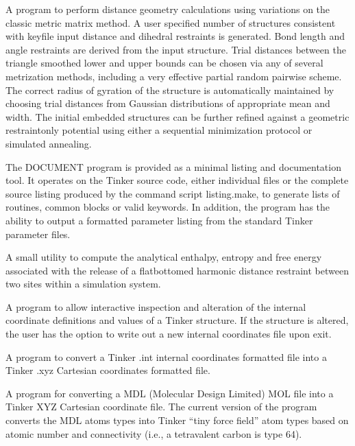 \documentclass[letterpaper,11pt,english]{sphinxmanual}
\begin{document}

A program to perform distance geometry calculations using variations on the classic metric matrix method. A user specified number of structures consistent with keyfile input distance and dihedral restraints is generated. Bond length and angle restraints are derived from the input structure. Trial distances between the triangle smoothed lower and upper bounds can be chosen via any of several metrization methods, including a very effective partial random pairwise scheme. The correct radius of gyration of the structure is automatically maintained by choosing trial distances from Gaussian distributions of appropriate mean and width. The initial embedded structures can be further refined against a geometric restraint\sphinxhyphen{}only potential using either a sequential minimization protocol or simulated annealing.


The DOCUMENT program is provided as a minimal listing and documentation tool. It operates on the Tinker source code, either individual files or the complete source listing produced by the command script listing.make, to generate lists of routines, common blocks or valid keywords. In addition, the program has the ability to output a formatted parameter listing from the standard Tinker parameter files.


A small utility to compute the analytical enthalpy, entropy and free energy associated with the release of a flat\sphinxhyphen{}bottomed harmonic distance restraint between two sites within a simulation system.


A program to allow interactive inspection and alteration of the internal coordinate definitions and values of a Tinker structure. If the structure is altered, the user has the option to write out a new internal coordinates file upon exit.


A program to convert a Tinker .int internal coordinates formatted file into a Tinker .xyz Cartesian coordinates formatted file.


A program for converting a MDL (Molecular Design Limited) MOL file into a Tinker XYZ Cartesian coordinate file. The current version of the program converts the MDL atoms types into Tinker “tiny force field” atom types based on atomic number and connectivity (i.e., a tetravalent carbon is type 64).
\end{document}
